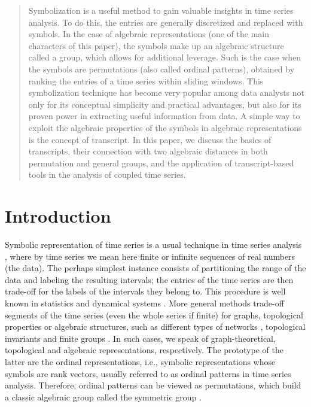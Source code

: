 \documentclass[%
 aip,
 amsmath,amssymb,
 reprint,%
]{revtex4-1}
\begin{document}
\maketitle

\begin{quotation}
Symbolization is a useful method to gain valuable
insights in time series analysis. To do this, the entries are generally
discretized and replaced with symbols. In the case of algebraic
representations (one of the main characters of this paper), the symbols make
up an algebraic structure called a group, which allows for additional
leverage. Such is the case when the symbols are permutations (also called
ordinal patterns), obtained by ranking the entries of a time series within
sliding windows. This symbolization technique has become very popular among
data analysts not only for its conceptual simplicity and practical
advantages, but also for its proven power in extracting useful information
from data. A simple way to exploit the algebraic properties of the symbols
in algebraic representations is the concept of transcript. In this paper, we
discuss the basics of transcripts, their connection with two algebraic
distances in both permutation and general groups, and the application of
transcript-based tools in the analysis of coupled time series.
\end{quotation}

\section{Introduction}

\label{sec1}

Symbolic representation of time series is a usual technique in time series
analysis \cite{Kantz1997}, where by time series we mean here finite or
infinite sequences of real numbers (the data). The perhaps simplest instance
consists of partitioning the range of the data and labeling the resulting
intervals; the entries of the time series are then trade-off for the labels
of the intervals they belong to. This procedure is well known in statistics
and dynamical systems \cite{Hirata2023}. More general methods trade-off
segments of the time series (even the whole series if finite) for graphs,
topological properties or algebraic structures, such as different types of
networks \cite{Zhang2006,Small2013,Zou2019}, topological invariants \cite%
{Lum2013,Perea2019,Haruna2023} and finite groups \cite{Amigo2016}. In such
cases, we speak of graph-theoretical, topological and algebraic
representations, respectively. The prototype of the latter are the ordinal
representations, i.e., symbolic representations whose symbols are rank
vectors, usually referred to as ordinal patterns \cite{Bandt2002,Mohr2020}
in time series analysis. Therefore, ordinal patterns can be viewed as
permutations, which build a classic algebraic group called the symmetric group \cite%
{Herstein1996,Lang2005}.
\end{document}
